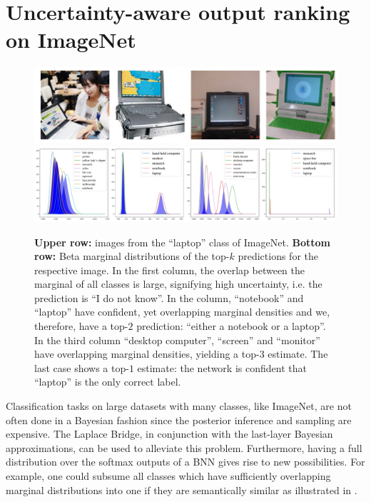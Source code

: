 \restoregeometry

\section{Uncertainty-aware output ranking on ImageNet}
\label{subsec:exp5_imagenet}

\setlength{\figwidth}{1\textwidth}
\setlength{\figheight}{0.18\textheight}

\begin{figure}[t]
	\centering
	\includegraphics[width=\figwidth,height=\figheight]{figures/imagenet_images.pdf}
	\includegraphics[width=\figwidth,height=\figheight]{figures/imagenet_marginal_betas.pdf}
	\caption{\textbf{Upper row:} images from the ``laptop'' class of ImageNet. \textbf{Bottom row:} Beta marginal distributions of the top-$k$ predictions for the respective image. In the first column, the overlap between the marginal of all classes is large, signifying high uncertainty, i.e. the prediction is ``I do not know''. In the column, ``notebook'' and ``laptop'' have confident, yet overlapping marginal densities and we, therefore, have a top-$2$ prediction: ``either a notebook or a laptop''. In the third column ``desktop computer'', ``screen'' and ``monitor'' have overlapping marginal densities, yielding a top-$3$ estimate. The last case shows a top-$1$ estimate: the network is confident that ``laptop'' is the only correct label.
	}
	\label{fig:imagenet_betas}
\end{figure}

Classification tasks on large datasets with many classes, like ImageNet, are not often done in a Bayesian fashion since the posterior inference and sampling are expensive. The Laplace Bridge, in conjunction with the last-layer Bayesian approximations, can be used to alleviate this problem. Furthermore, having a full distribution over the softmax outputs of a BNN gives rise to new possibilities. For example, one could subsume all classes which have sufficiently overlapping marginal distributions into one if they are semantically similar as illustrated in .


